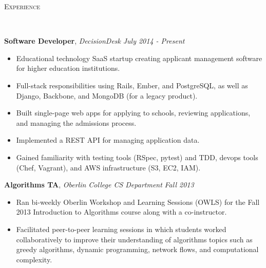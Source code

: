 \documentclass[9pt]{article}
\newenvironment{changemargin}[2]{%
  \begin{list}{}{%
    \setlength{\topsep}{0pt}%
    \setlength{\leftmargin}{#1}%
    \setlength{\rightmargin}{#2}%
    \setlength{\listparindent}{\parindent}%
    \setlength{\itemindent}{\parindent}%
    \setlength{\parsep}{\parskip}%
  }%
  \item[]}{\end{list}
}
\newcommand{\lineover}{
	\begin{changemargin}{-0.05in}{-0.05in}
		\vspace*{-8pt}
		\hrulefill \\
		\vspace*{-2pt}
	\end{changemargin}
}
\newcommand{\header}[1]{
	\begin{changemargin}{-0.5in}{-0.5in}
		\scshape{#1}\\
  	\lineover
	\end{changemargin}
}
\newenvironment{body} {
	\vspace*{-16pt}
	\begin{changemargin}{-0.25in}{-0.5in}
  }	
	{\end{changemargin}
}
\begin{document}
\smallskip

\header{Experience}

\begin{body}
	\vspace{14pt}

	\textbf{Software Developer}, \emph{DecisionDesk} \hfill \emph{July 2014 - Present}\\
	\vspace*{-4pt}
	\begin{itemize} \itemsep -0pt  %
		\item Educational technology SaaS startup creating applicant management software for higher education institutions.
		\item Full-stack responsibilities using Rails, Ember, and PostgreSQL, as well as Django, Backbone, and MongoDB (for a legacy product).
		\item Built single-page web apps for applying to schools, reviewing applications, and managing the admissions process.
		\item Implemented a REST API for managing application data.
		\item Gained familiarity with testing tools (RSpec, pytest) and TDD, devops tools (Chef, Vagrant),  and AWS infrastructure (S3, EC2, IAM).
	\end{itemize}

	\textbf{Algorithms TA}, \emph{Oberlin College CS Department} \hfill \emph{Fall 2013}\\
	\vspace*{-4pt}
	\begin{itemize} \itemsep -0pt  %
		\item Ran bi-weekly Oberlin Workshop and Learning Sessions (OWLS) for the Fall 2013 Introduction to Algorithms course along with a co-instructor.
		\item Facilitated peer-to-peer learning sessions in which students worked collaboratively to improve their understanding of algorithms topics such as greedy algorithms, dynamic programming, network flows, and computational complexity.
	\end{itemize}


\end{body}
\end{document}
